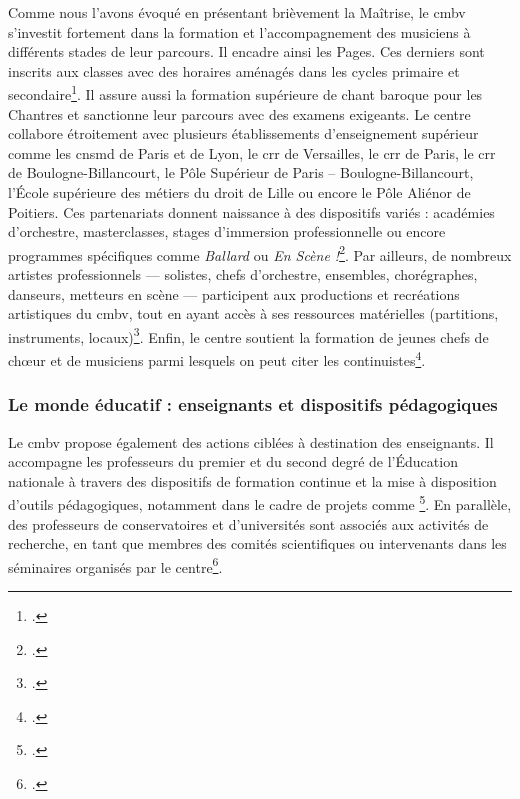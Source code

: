Comme nous l'avons évoqué en présentant brièvement la Maîtrise, le \gls{cmbv} s’investit fortement dans la formation et l’accompagnement des musiciens à différents stades de leur parcours. Il encadre ainsi les Pages. Ces derniers sont inscrits aux classes avec des horaires aménagés dans les cycles primaire et secondaire\footcite{CentreMusiqueBaroquec}. Il assure aussi la formation supérieure de chant baroque pour les Chantres et sanctionne leur parcours avec des examens exigeants. Le centre collabore étroitement avec plusieurs établissements d’enseignement supérieur comme les \gls{cnsmd} de Paris et de Lyon, le \gls{crr} de Versailles, le \gls{crr} de Paris, le \gls{crr} de Boulogne-Billancourt, le Pôle Supérieur de Paris – Boulogne-Billancourt, l'École supérieure des métiers du droit de Lille ou encore le Pôle Aliénor de Poitiers. Ces partenariats donnent naissance à des dispositifs variés : académies d’orchestre, masterclasses, stages d’immersion professionnelle ou encore programmes spécifiques comme \textit{Ballard} ou \textit{En Scène !}\footcite{centredemusiquebaroquedeversaillesProjetEtablissement2022}. Par ailleurs, de nombreux artistes professionnels --- solistes, chefs d’orchestre, ensembles, chorégraphes, danseurs, metteurs en scène --- participent aux productions et recréations artistiques du \gls{cmbv}, tout en ayant accès à ses ressources matérielles (partitions, instruments, locaux)\footcite{CentreMusiqueBaroque}. Enfin, le centre soutient la formation de jeunes chefs de chœur et de musiciens parmi lesquels on peut citer les \glspl{continuiste}\footcite{centredemusiquebaroquedeversaillesProjetEtablissement2022}.

\subsubsection{Le monde éducatif : enseignants et dispositifs pédagogiques}

Le \gls{cmbv} propose également des actions ciblées à destination des enseignants. Il accompagne les professeurs du premier et du second degré de l’Éducation nationale à travers des dispositifs de formation continue et la mise à disposition d’outils pédagogiques, notamment dans le cadre de projets comme \footcite{centredemusiquebaroquedeversaillesProjetEtablissement2022}. En parallèle, des professeurs de conservatoires et d’universités sont associés aux activités de recherche, en tant que membres des comités scientifiques ou intervenants dans les séminaires organisés par le centre\footcite{centredemusiquebaroquedeversaillesRapportActivite2023}.


